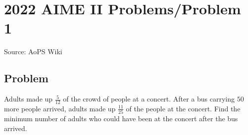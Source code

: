 \documentclass[12pt]{article}
\begin{document}
\section*{{2022 AIME II Problems/Problem 1}}
Source: AoPS Wiki

\subsection*{Problem}
Adults made up $\frac5{12}$ of the crowd of people at a concert. After a bus carrying $50$ more people arrived, adults made up $\frac{11}{25}$ of the people at the concert. Find the minimum number of adults who could have been at the concert after the bus arrived.
\end{document}

